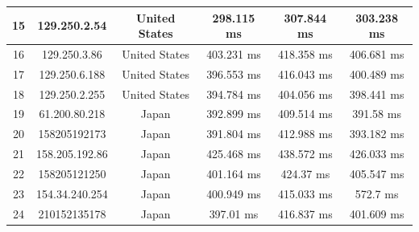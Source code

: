 \begin{table}[]
\begin{tabular}{ | c | c | c | c | c | c | }
15	&129.250.2.54    &    	   United States &   	     298.115 ms    & 	     307.844 ms     &	     303.238 ms  \\ \hline    
16	&129.250.3.86    &    	   United States &   	     403.231 ms    & 	     418.358 ms     &	     406.681 ms  \\ \hline    
17	&129.250.6.188   &    	   United States &   	     396.553 ms    & 	     416.043 ms     &	     400.489 ms  \\ \hline    
18	&129.250.2.255   &    	   United States &   	     394.784 ms    & 	     404.056 ms     &	     398.441 ms  \\ \hline    
19	&61.200.80.218   &    	       Japan     &   	     392.899 ms    & 	     409.514 ms     &	      391.58 ms  \\ \hline    
20	&158205192173	 &      Japan        	  &   391.804 ms     	    & 412.988 ms     	     &393.182 ms     \\ \hline    
21	&158.205.192.86  &    	       Japan     &   	     425.468 ms    & 	     438.572 ms     &	     426.033 ms  \\ \hline     
22	&158205121250	 &      Japan        	  &   401.164 ms     	    &  424.37 ms     	     &405.547 ms     \\ \hline    
23	&154.34.240.254  &    	       Japan     &   	     400.949 ms    & 	     415.033 ms     &	       572.7 ms  \\ \hline    
24	&210152135178	 &      Japan        	  &    397.01 ms     	    & 416.837 ms     	     &401.609 ms         \\ \hline

\end{tabular}
\end{table}

